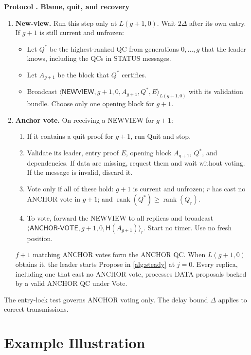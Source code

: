 \documentclass[11pt,a4paper]{article}
\newcommand{\RR}[1]{{\color{rrRed}#1}}
\newcommand{\Hash}{\mathsf H}
\newcommand{\rank}{\operatorname{rank}}
\newcommand{\tagg}[1]{\ensuremath{\mathsf{#1}}}
\newcounter{protocol}
\newenvironment{protocol}[2]{\refstepcounter{protocol}\label{#1}
\begin{mdframed}[nobreak=true,linewidth=.6pt,skipabove=8pt,skipbelow=8pt,
innertopmargin=7pt,innerbottommargin=7pt]\small
\textbf{Protocol \theprotocol. #2}\par\smallskip}{\end{mdframed}}
\begin{document}
\begin{protocol}{alg:recovery}{Blame, quit, and recovery}
\begin{enumerate}[label=\textbf{\arabic*)},itemsep=5pt]
\item \textbf{New-view.} Run this step only at $L(g+1,0)$. Wait $2\Delta$
after its own entry. If $g+1$ is still current and unfrozen:
 \begin{itemize}
 \item Let $Q^*$ be the highest-ranked QC from generations $0,\ldots,g$
       that the leader knows, including the QCs in STATUS
       messages.
 \item Let $A_{g+1}$ be the block that $Q^*$ certifies.
 \item Broadcast
       $\langle\tagg{NEWVIEW},g+1,0,A_{g+1},Q^*,E\rangle_{L(g+1,0)}$
       with its validation bundle. \RR{Choose only one opening block for
       $g+1$.}
 \end{itemize}

\item \textbf{Anchor vote.} On receiving a NEWVIEW for $g+1$:
 \begin{enumerate}[label=(\alph*)]
 \item \RR{If it contains a quit proof for $g+1$, run Quit and stop.}
 \item Validate its leader, entry proof $E$, opening block $A_{g+1}$,
       $Q^*$, and dependencies. If data are missing, request them and
       wait without voting. If the message is invalid, discard it.
 \item Vote only if all of these hold: $g+1$ is current and unfrozen; $r$
       has cast no ANCHOR vote in $g+1$; and $\rank(Q^*)\ge\rank(Q_r)$.
 \item To vote, forward the NEWVIEW to all replicas and broadcast
       $\langle\tagg{ANCHOR\mbox{-}VOTE},g+1,0,\Hash(A_{g+1})\rangle_r$.
       \RR{Start no timer. Use no fresh position.}
 \end{enumerate}
 $f+1$ matching ANCHOR votes form the ANCHOR QC. When $L(g+1,0)$
 obtains it, the leader starts Propose \RR{in \cref{alg:steady} at
 $j=0$}. Every replica, including one that cast no ANCHOR vote,
 processes DATA proposals backed by a valid ANCHOR QC under Vote.
\end{enumerate}
\end{protocol}

The entry-lock test governs ANCHOR voting only.
The delay bound $\Delta$ applies to correct transmissions.


\clearpage 


\section{Example Illustration}
\end{document}
